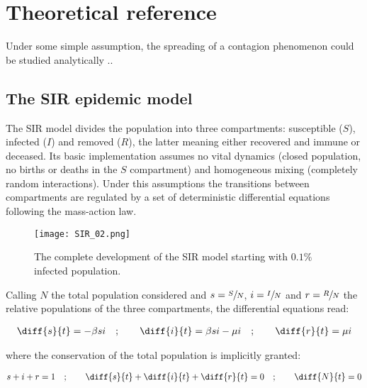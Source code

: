 \documentclass[DIV=12, BCOR=0pt]{scrartcl}  %
\begin{document}
  
  \section{Theoretical reference}
  Under some simple assumption, the spreading of a contagion phenomenon could be studied analytically ..
  
  \subsection{The SIR epidemic model}
  The SIR model divides the population into three compartments: susceptible ($S$), infected ($I$) and removed ($R$), the latter meaning either recovered and immune or deceased. Its basic implementation assumes no vital dynamics (closed population, no births or deaths in the $S$ compartment) and homogeneous mixing (completely random interactions). Under this assumptions the transitions between compartments are regulated by a set of deterministic differential equations following the mass-action law. 
    
  \begin{figure}[h!]
  	\centering
  	\texttt{[image: SIR\_02.png]}
  	\caption{The complete development of the SIR model starting with $0.1\%$ infected population.}
  	\label{fig:SIRoverall}
  \end{figure}

  Calling $N$ the total population considered and $s = \sfrac{S}{N}$, $i = \sfrac{I}{N}$ and $r = \sfrac{R}{N}$ the relative populations of the three compartments, the differential equations read:
  
  \begin{align}
  	\diff{s}{t} = - \beta s i \quad;  \qquad 	\diff{i}{t} = \beta s i - \mu i \quad; \qquad  \diff{r}{t} = \mu i
  	\label{eq:sir}
  \end{align}

  where the conservation of the total population is implicitly granted: %
  
  \begin{align}
  	s + i + r = 1 \quad ; \qquad \diff{s}{t} + \diff{i}{t} + \diff{r}{t} = 0  \quad ; \qquad  \diff{N}{t}= 0
  	\label{eq:sir_sum}
  \end{align}
\end{document}
